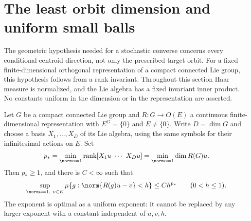 \section{The least orbit dimension and uniform small balls}\label{sec:minorbits58}
The geometric hypothesis needed for a stochastic converse concerns every
conditional-centroid direction, not only the prescribed target orbit.
For a fixed finite-dimensional orthogonal representation of a compact
connected Lie group, this hypothesis follows from a rank invariant.
Throughout this section Haar measure is normalized, and the Lie algebra
has a fixed invariant inner product. No constants uniform in the dimension
or in the representation are asserted.

\begin{theorem}
\label{thm:minorbit58}
Let $G$ be a compact connected Lie group and $R:G\to O(E)$ a continuous
finite-dimensional representation with $E^G=\{0\}$ and $E\ne\{0\}$.
Write $D=\dim G$ and choose a basis $X_1,\ldots,X_D$ of its Lie algebra,
using the same symbols for their infinitesimal actions on $E$. Set
\begin{equation}\label{eq:minrank58}
 p_* =\min_{\norm u=1}\operatorname{rank}
       [X_1u\ \cdots\ X_Du]
     =\min_{\norm u=1}\dim R(G)u.
\end{equation}
Then $p_*\ge1$, and there is $C<\infty$ such that
\begin{equation}\label{eq:mincap58}
 \sup_{\norm u=1,\ v\in E}
 \mu\{g:\norm{R(g)u-v}<h\}\le C h^{p_*}
                 \qquad(0<h\le1).
\end{equation}
The exponent is optimal as a uniform exponent: it cannot be replaced by
any larger exponent with a constant independent of $u,v,h$.
\end{theorem}
